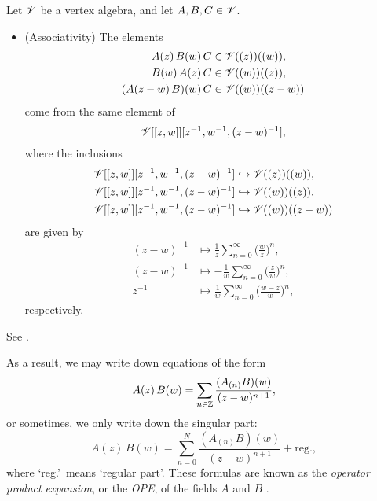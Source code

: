 \begin{theorem}
    \label{thm-assoc}
    Let $\mathscr{V}$ be a vertex algebra,
    and let $A, B, C \in \mathscr{V}$. 
    \begin{itemize}
        \item
            \textup{(Associativity)}
            The elements
            \begin{align*}
                A (z) \, B (w) \, C
                & \in \mathscr{V} ((z)) ((w)), \\
                B (w) \, A (z) \, C
                & \in \mathscr{V} ((w)) ((z)), \\
                (A (z - w) \, B) (w) \, C
                & \in \mathscr{V} ((w)) ((z - w))
            \end{align*}
            come from the same element of
            \[
                \mathscr{V} [[z, w]] [z^{-1}, w^{-1}, (z-w)^{-1}],
            \]
            where the inclusions
            \begin{align*}
                \mathscr{V} [[z, w]] [z^{-1}, w^{-1}, (z-w)^{-1}]
                & \hookrightarrow \mathscr{V} ((z)) ((w)), \\
                \mathscr{V} [[z, w]] [z^{-1}, w^{-1}, (z-w)^{-1}]
                & \hookrightarrow \mathscr{V} ((w)) ((z)), \\
                \mathscr{V} [[z, w]] [z^{-1}, w^{-1}, (z-w)^{-1}]
                & \hookrightarrow \mathscr{V} ((w)) ((z-w))
            \end{align*}
            are given by
            \begin{align*}
                (z-w)^{-1} & \mapsto
                \frac{1}{z} \sum_{n=0}^\infty
                \biggl( \frac{w}{z} \biggr)^n, \\
                (z-w)^{-1} & \mapsto
                -\frac{1}{w} \sum_{n=0}^\infty
                \biggl( \frac{z}{w} \biggr)^n, \\
                z^{-1} & \mapsto
                \frac{1}{w} \sum_{n=0}^\infty
                \biggl( \frac{w-z}{w} \biggr)^n,
            \end{align*}
            respectively.
    \end{itemize}
\end{theorem}

See \cite[Theorem~3.2.1]{frenkel-ben-zvi}.

As a result,
we may write down equations of the form
\[
    A (z) \, B (w) =
    \sum_{n \in \mathbb{Z}} \frac{(A_{(n)} B) (w)}{(z - w)^{n+1}},
\]
or sometimes, we only write down the singular part:
\[
    A (z) \, B (w) =
    \sum_{n = 0}^N \frac{(A_{(n)} B) (w)}{(z - w)^{n+1}}
    + \text{reg.},
\]
where `reg.'\ means `regular part'.
These formulas are known as the
\emph{operator product expansion}, or the \emph{OPE},
of the fields $A$ and $B$
\cite[\S3.3]{frenkel-ben-zvi}.

